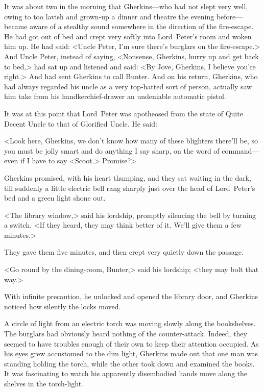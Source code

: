 It was about two in the morning that Gherkins—who had not slept very well, owing to too lavish and grown-up a dinner and theatre the evening before—became aware of a stealthy sound somewhere in the direction of the fire-escape. He had got out of bed and crept very softly into Lord~Peter's room and woken him up. He had said: <Uncle Peter, I'm sure there's burglars on the fire-escape.> And Uncle Peter, instead of saying, <Nonsense, Gherkins, hurry up and get back to bed,> had sat up and listened and said: <By Jove, Gherkins, I believe you're right.> And had sent Gherkins to call Bunter. And on his return, Gherkins, who had always regarded his uncle as a very top-hatted sort of person, actually saw him take from his handkerchief-drawer an undeniable automatic pistol.

It was at this point that Lord~Peter was apotheosed from the state of Quite Decent Uncle to that of Glorified Uncle. He said:

<Look here, Gherkins, we don't know how many of these blighters there'll be, so you must be jolly smart and do anything I say sharp, on the word of command—even if I have to say <Scoot.> Promise?>

Gherkins promised, with his heart thumping, and they sat waiting in the dark, till suddenly a little electric bell rang sharply just over the head of Lord~Peter's bed and a green light shone out.

<The library window,> said his lordship, promptly silencing the bell by turning a switch. <If they heard, they may think better of it. We'll give them a few minutes.>

They gave them five minutes, and then crept very quietly down the passage.

<Go round by the dining-room, Bunter,> said his lordship; <they may bolt that way.>

With infinite precaution, he unlocked and opened the library door, and Gherkins noticed how silently the locks moved.

A circle of light from an electric torch was moving slowly along the bookshelves. The burglars had obviously heard nothing of the counter-attack. Indeed, they seemed to have troubles enough of their own to keep their attention occupied. As his eyes grew accustomed to the dim light, Gherkins made out that one man was standing holding the torch, while the other took down and examined the books. It was fascinating to watch his apparently disembodied hands move along the shelves in the torch-light.

